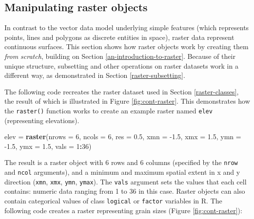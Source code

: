 \documentclass[]{krantz}
\newenvironment{Shaded}{\begin{snugshade}}{\end{snugshade}}
\newcommand{\DataTypeTok}[1]{\textcolor[rgb]{0.27,0.27,0.27}{#1}}
\newcommand{\DecValTok}[1]{\textcolor[rgb]{0.06,0.06,0.06}{#1}}
\newcommand{\FloatTok}[1]{\textcolor[rgb]{0.06,0.06,0.06}{#1}}
\newcommand{\KeywordTok}[1]{\textcolor[rgb]{0.27,0.27,0.27}{\textbf{#1}}}
\newcommand{\NormalTok}[1]{#1}
\newcommand{\OperatorTok}[1]{\textcolor[rgb]{0.43,0.43,0.43}{\textbf{#1}}}
\newcommand{\StringTok}[1]{\textcolor[rgb]{0.5,0.5,0.5}{#1}}
\begin{document}
\hypertarget{manipulating-raster-objects}{%
\subsection{Manipulating raster objects}\label{manipulating-raster-objects}}

In contrast to the vector data model underlying simple features (which represents points, lines and polygons as discrete entities in space), raster data represent continuous surfaces.
This section shows how raster objects work by creating them \emph{from scratch}, building on Section \ref{an-introduction-to-raster}.
Because of their unique structure, subsetting and other operations on raster datasets work in a different way, as demonstrated in Section \ref{raster-subsetting}.

The following code recreates the raster dataset used in Section \ref{raster-classes}, the result of which is illustrated in Figure \ref{fig:cont-raster}.
This demonstrates how the \texttt{raster()} function works to create an example raster named \texttt{elev} (representing elevations).

\begin{Shaded}
\begin{Highlighting}[]
\NormalTok{elev =}\StringTok{ }\KeywordTok{raster}\NormalTok{(}\DataTypeTok{nrows =} \DecValTok{6}\NormalTok{, }\DataTypeTok{ncols =} \DecValTok{6}\NormalTok{, }\DataTypeTok{res =} \FloatTok{0.5}\NormalTok{,}
              \DataTypeTok{xmn =} \FloatTok{-1.5}\NormalTok{, }\DataTypeTok{xmx =} \FloatTok{1.5}\NormalTok{, }\DataTypeTok{ymn =} \FloatTok{-1.5}\NormalTok{, }\DataTypeTok{ymx =} \FloatTok{1.5}\NormalTok{,}
              \DataTypeTok{vals =} \DecValTok{1}\OperatorTok{:}\DecValTok{36}\NormalTok{)}
\end{Highlighting}
\end{Shaded}

The result is a raster object with 6 rows and 6 columns (specified by the \texttt{nrow} and \texttt{ncol} arguments), and a minimum and maximum spatial extent in x and y direction (\texttt{xmn}, \texttt{xmx}, \texttt{ymn}, \texttt{ymax}).
The \texttt{vals} argument sets the values that each cell contains: numeric data ranging from 1 to 36 in this case.
Raster objects can also contain categorical values of class \texttt{logical} or \texttt{factor} variables in R.
The following code creates a raster representing grain sizes (Figure \ref{fig:cont-raster}):
\end{document}
